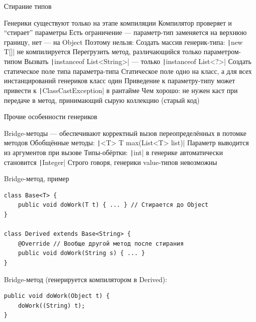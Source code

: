 \documentclass{../../slides-style}
\begin{document}
    \begin{frame}{Стирание типов}
        \begin{outline}
            \1 Генерики существуют только на этапе компиляции
                \2 Компилятор проверяет и \enquote{стирает} параметры
                    \3 Есть ограничение --- параметр-тип заменяется на верхнюю границу, нет --- на Object
            \1 Поэтому нельзя:
                \2 Создать массив генерик-типа: \texttt|new T[]| не компилируется
                \2 Перегрузить метод, различающийся только параметром-типом
                \2 Вызвать \texttt|instanceof List<String>| --- только \texttt|instanceof List<?>|
                \2 Создать статическое поле типа параметра-типа
                    \3 Статическое поле одно на класс, а для всех инстанцирований генериков класс один
            \1 Приведение к параметру-типу может привести к \texttt|ClassCastException| в рантайме
            \1 Чем хорошо: не нужен каст при передаче в метод, принимающий сырую коллекцию (старый код)
        \end{outline}
    \end{frame}

    \begin{frame}{Прочие особенности генериков}
        \begin{outline}
            \1 Bridge-методы --- обеспечивают корректный вызов переопределённых в потомке методов
            \1 Обобщённые методы: \texttt|<T> T max(List<T> list)|
                \2 Параметр выводится из аргументов при вызове
            \1 Типы-обёртки: \texttt|int| в генерике автоматически становится \texttt|Integer|
                \2 Строго говоря, генерики value-типов невозможны
        \end{outline}
    \end{frame}

    \begin{frame}[fragile]{Bridge-метод, пример}
        \begin{verbatim}
class Base<T> {
    public void doWork(T t) { ... } // Стирается до Object
}

class Derived extends Base<String> {
    @Override // Вообще другой метод после стирания
    public void doWork(String s) { ... } 
}
        \end{verbatim}

        \vspace{1cm}
        Bridge-метод (генерируется компилятором в Derived):

        \begin{verbatim}
public void doWork(Object t) {
    doWork((String) t);
}
        \end{verbatim}
    \end{frame}
\end{document}
